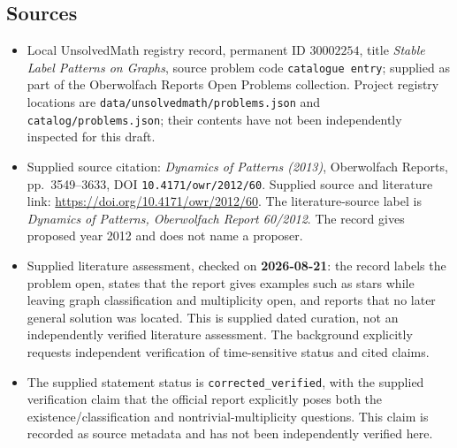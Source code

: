 \documentclass[11pt]{article}
\begin{document}
\subsection{Sources}
\begin{itemize}
\item Local UnsolvedMath registry record, permanent ID \(30002254\), title \emph{Stable Label Patterns on Graphs}, source problem code \texttt{catalogue entry}; supplied as part of the Oberwolfach Reports Open Problems collection. Project registry locations are \texttt{data/unsolvedmath/problems.json} and \texttt{catalog/problems.json}; their contents have not been independently inspected for this draft.
\item Supplied source citation: \emph{Dynamics of Patterns (2013)}, Oberwolfach Reports, pp.\ 3549--3633, DOI \texttt{10.4171/owr/2012/60}. Supplied source and literature link: \url{https://doi.org/10.4171/owr/2012/60}. The literature-source label is \emph{Dynamics of Patterns, Oberwolfach Report 60/2012}. The record gives proposed year 2012 and does not name a proposer.
\item Supplied literature assessment, checked on \textbf{2026-08-21}: the record labels the problem open, states that the report gives examples such as stars while leaving graph classification and multiplicity open, and reports that no later general solution was located. This is supplied dated curation, not an independently verified literature assessment. The background explicitly requests independent verification of time-sensitive status and cited claims.
\item The supplied statement status is \texttt{corrected\_verified}, with the supplied verification claim that the official report explicitly poses both the existence/classification and nontrivial-multiplicity questions. This claim is recorded as source metadata and has not been independently verified here.
\end{itemize}
\end{document}
